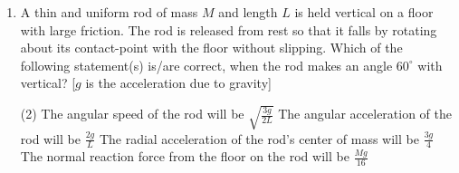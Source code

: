 
\begin{enumerate}
    \item A thin and uniform rod of mass \( M \) and length \( L \) is held vertical on a floor with large friction. The rod is released from rest so that it falls by rotating about its contact-point with the floor without slipping. Which of the following statement(s) is/are correct, when the rod makes an angle \( 60^\circ \) with vertical? [\( g \) is the acceleration due to gravity]
        \begin{tasks}(2)
            \task The angular speed of the rod will be \( \sqrt{\frac{3g}{2L}} \)
            \task The angular acceleration of the rod will be \( \frac{2g}{L} \)
            \task The radial acceleration of the rod's center of mass will be \( \frac{3g}{4} \)
            \task The normal reaction force from the floor on the rod will be \( \frac{Mg}{16} \)
        \end{tasks}
\end{enumerate}

